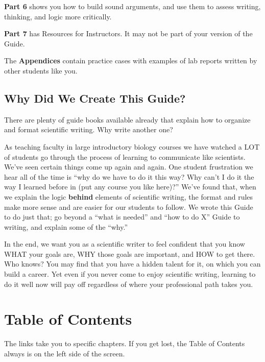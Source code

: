 \documentclass[
]{book}
\begin{document}
\textbf{Part 6} shows you how to build sound arguments, and use them to assess writing, thinking, and logic more critically.

\textbf{Part 7} has Resources for Instructors. It may not be part of your version of the Guide.

The \textbf{Appendices} contain practice cases with examples of lab reports written by other students like you.

\hypertarget{why-did-we-create-this-guide}{%
\section*{Why Did We Create This Guide?}\label{why-did-we-create-this-guide}}

There are plenty of guide books available already that explain how to organize and format scientific writing. Why write another one?

As teaching faculty in large introductory biology courses we have watched a LOT of students go through the process of learning to communicate like scientists. We've seen certain things come up again and again. One student frustration we hear all of the time is ``why do we have to do it this way? Why can't I do it the way I learned before in (put any course you like here)?'' We've found that, when we explain the logic \textbf{behind} elements of scientific writing, the format and rules make more sense and are easier for our students to follow. We wrote this Guide to do just that; go beyond a ``what is needed'' and ``how to do X'' Guide to writing, and explain some of the ``why.''

In the end, we want you as a scientific writer to feel confident that you know WHAT your goals are, WHY those goals are important, and HOW to get there. Who knows? You may find that you have a hidden talent for it, on which you can build a career. Yet even if you never come to enjoy scientific writing, learning to do it well now will pay off regardless of where your professional path takes you.

\hypertarget{table-of-contents}{%
\chapter*{Table of Contents}\label{table-of-contents}}

The links take you to specific chapters. If you get lost, the Table of Contents always is on the left side of the screen.
\end{document}
